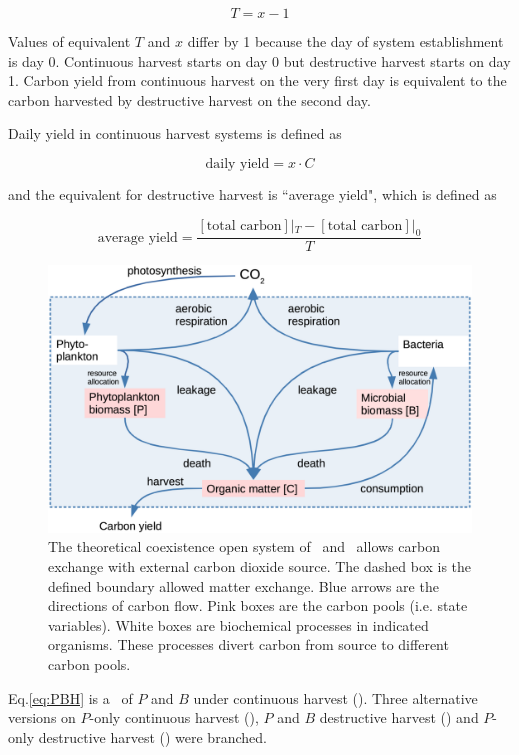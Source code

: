 \documentclass[../thesis.tex]{subfiles} %
\begin{document}
\begin{equation*}
    T = x-1
    \label{eq:TvsX}
\end{equation*}

Values of equivalent $T$ and $x$ differ by 1 because the day of system establishment is day 0.  Continuous harvest starts on day 0 but destructive harvest starts on day 1.  Carbon yield from continuous harvest on the very first day is equivalent to the carbon harvested by destructive harvest on the second day.

Daily yield in continuous harvest systems is defined as

\begin{equation}
    \text{daily yield} = x\cdot C
    \label{eq:yield}
\end{equation}

and the equivalent for destructive harvest is ``average yield", which is defined as

\begin{equation*}
    \text{average yield} = \dfrac{[\text{total carbon}]|_{T}-[\text{total carbon}]|_{0}}{T}
    \label{eq:avgYd}
\end{equation*}

\begin{figure}[H]
    \centering
    \includegraphics[width=.8\linewidth]{media/model.png}
    \caption[Model visualization]{The theoretical coexistence open system of \phy\ and \bac\ allows carbon exchange with external carbon dioxide source.  The dashed box is the defined boundary allowed matter exchange.  Blue arrows are the directions of carbon flow.  Pink boxes are the carbon pools (i.e. state variables).  White boxes are biochemical processes in indicated organisms.  These processes divert carbon from source to different carbon pools.}
    \label{f:model}
\end{figure}

Eq.\ref{eq:PBH} is a \pbs\ of $P$ and $B$ under continuous harvest (\PBH).  Three alternative versions on $P$-only continuous harvest (\PoH), $P$ and $B$ destructive harvest (\PBN) and $P$-only destructive harvest (\PoN) were branched.
\end{document}
